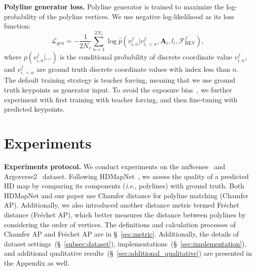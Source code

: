 \documentclass{article}
\newcommand{\ie}{\textit{i}.\textit{e}., }
\theoremstyle{plain}
\theoremstyle{definition}
\theoremstyle{remark}
\begin{document}
\noindent\textbf{Polyline generator loss.} 
Polyline generator is trained to maximize the log-probability of the polyline vertices. We use negative log-likelihood as its loss function: 
\begin{equation}
\mathcal{L}_{gen}=- \frac{1}{2N_v} \sum_{n=1}^{2N_v} \log \hat{p}(v_{i,n}^{f}| v_{i,<n}^{f}, \bm{A}_{i}, l_{i}, \bm{\mathcal{F}}_{\mathrm{BEV}}^f),
\end{equation}
where $\hat{p}(v_{i,n}^{f}|\dots)$ is the conditional probability of discrete coordinate value $v_{i,n}^{f}$, and $v_{i,<n}^{f}$ are ground truth discrete coordinate values with index less than $n$.
The default training strategy is teacher forcing, meaning that we use ground truth keypoints as generator input. To avoid the exposure bias~\citep{bengio2015scheduled}, we further experiment with first training with teacher forcing, and then fine-tuning with predicted keypoints. 


\section{Experiments}
\label{sec:experiment}
\noindent\textbf{Experiments protocol.} We conduct experiments on the nuScenes~\citep{caesar2020nuscenes} and Argoverse2~\citep{Argoverse2} dataset. 
Following HDMapNet~\citep{li2021hdmapnet}, we assess the quality of a predicted HD map by comparing its components (\ie polylines) with ground truth.
Both HDMapNet and our paper use Chamfer distance for polyline matching (Chamfer AP). Additionally, we also introduced another distance metric termed Fr\'echet distance (Fr\'echet AP), which better measures the distance between polylines by considering the order of vertices. The definitions and calculation processes of Chamfer AP and Fr\'echet AP are in \S~\ref{sec:metric}.
Additionally, the details of dataset settings~(\S~\ref{subsec:dataset}), implementations~(\S~\ref{sec:implementation}), and additional qualitative results~(\S~\ref{sec:additional_qualitative}) are presented in the Appendix as well. 
\end{document}
